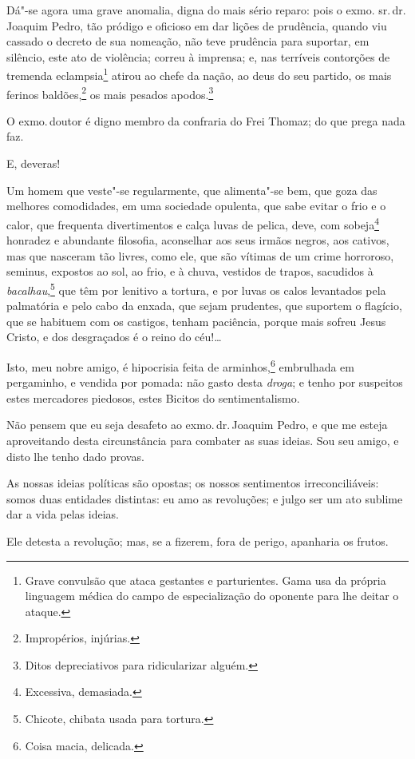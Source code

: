 Dá"-se agora uma grave anomalia, digna do mais sério reparo: pois o exmo.
sr.\,dr.\,Joaquim Pedro, tão pródigo e oficioso em dar lições de
prudência, quando viu cassado o decreto de sua nomeação, não teve
prudência para suportar, em silêncio, este ato de violência; correu à
imprensa; e, nas terríveis contorções de tremenda eclampsia\footnote{
  Grave convulsão que ataca gestantes e parturientes. Gama usa da
  própria linguagem médica do campo de especialização do oponente para
  lhe deitar o ataque.} atirou ao chefe da nação, ao deus do seu
partido, os mais ferinos baldões,\footnote{Impropérios, injúrias.} os
mais pesados apodos.\footnote{Ditos depreciativos para ridicularizar
  alguém.}

O exmo.\,doutor é digno membro da confraria do Frei Thomaz; do que prega
nada faz.

E, deveras!

Um homem que veste"-se regularmente, que alimenta"-se bem, que goza das
melhores comodidades, em uma sociedade opulenta, que sabe evitar o frio
e o calor, que frequenta divertimentos e calça luvas de pelica, deve,
com sobeja\footnote{Excessiva, demasiada.} honradez e abundante
filosofia, aconselhar aos seus irmãos negros, aos cativos, mas que
nasceram tão livres, como ele, que são vítimas de um crime horroroso,
seminus, expostos ao sol, ao frio, e à chuva, vestidos de trapos,
sacudidos à \emph{bacalhau},\footnote{Chicote, chibata usada para
  tortura.} que têm por lenitivo a tortura, e por luvas os calos
levantados pela palmatória e pelo cabo da enxada, que sejam prudentes,
que suportem o flagício, que se habituem com os castigos, tenham
paciência, porque mais sofreu Jesus Cristo, e dos desgraçados é o reino
do céu!\ldots{}

Isto, meu nobre amigo, é hipocrisia feita de arminhos,\footnote{Coisa
  macia, delicada.} embrulhada em pergaminho, e vendida por pomada: não
gasto desta \emph{droga}; e tenho por suspeitos estes mercadores
piedosos, estes Bicitos do sentimentalismo.

Não pensem que eu seja desafeto ao exmo.\,dr.\,Joaquim Pedro, e que me
esteja aproveitando desta circunstância para combater as suas ideias.
Sou seu amigo, e disto lhe tenho dado provas.

As nossas ideias políticas são opostas; os nossos sentimentos
irreconciliáveis: somos duas entidades distintas: eu amo as revoluções;
e julgo ser um ato sublime dar a vida pelas ideias.

Ele detesta a revolução; mas, se a fizerem, fora de perigo, apanharia os
frutos.

